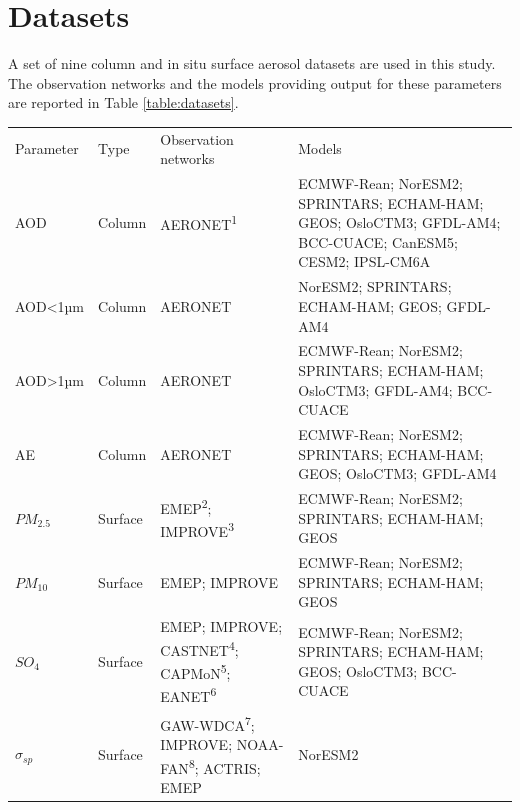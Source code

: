\documentclass[journal abbreviation, manuscript]{copernicus}
\begin{document}
\section{Datasets}
A set of nine column and in situ surface aerosol datasets are used in this study. The observation networks and the models providing output for these parameters are reported in Table \ref{table:datasets}.

\begin{table}
\footnotesize
 \begin{tabularx}{\textwidth}{lllX}
  \tophline
  Parameter   & Type    & Observation networks & Models                                                                                                    \\
  \middlehline
  AOD         & Column  & AERONET\textsuperscript{1}             & ECMWF-Rean; NorESM2; SPRINTARS; ECHAM-HAM; GEOS; OsloCTM3; GFDL-AM4; BCC-CUACE; CanESM5; CESM2; IPSL-CM6A \\
  AOD<1µm     & Column  & AERONET             & NorESM2; SPRINTARS; ECHAM-HAM; GEOS; GFDL-AM4                                                             \\
  AOD>1µm     & Column  & AERONET             & ECMWF-Rean; NorESM2; SPRINTARS; ECHAM-HAM; OsloCTM3; GFDL-AM4; BCC-CUACE                                  \\
  AE          & Column  & AERONET             & ECMWF-Rean; NorESM2; SPRINTARS; ECHAM-HAM; GEOS; OsloCTM3; GFDL-AM4                                       \\
  $PM_{2.5}$  & Surface & EMEP\textsuperscript{2}; IMPROVE\textsuperscript{3}                 & ECMWF-Rean;  NorESM2;  SPRINTARS;  ECHAM-HAM; GEOS                                                                                       \\
  $PM_{10}$   & Surface & EMEP; IMPROVE                 & ECMWF-Rean; NorESM2; SPRINTARS; ECHAM-HAM; GEOS                                                           \\
  $SO_{4}$    & Surface & EMEP; IMPROVE; CASTNET\textsuperscript{4}; CAPMoN\textsuperscript{5}; EANET\textsuperscript{6}             & ECMWF-Rean; NorESM2; SPRINTARS; ECHAM-HAM; GEOS; OsloCTM3; BCC-CUACE                                      \\
 $\sigma_{sp}$ & Surface & GAW-WDCA\textsuperscript{7}; IMPROVE; NOAA-FAN\textsuperscript{8}; ACTRIS; EMEP  & NorESM2                                                                                                   \\

\end{tabularx}
\end{table}
\end{document}
